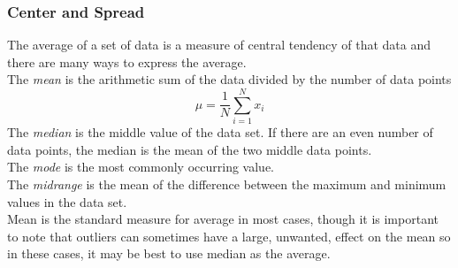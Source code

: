 \documentclass[11pt, fleqn]{article}
\begin{document}
\subsubsection{Center and Spread}
The average of a set of data is a measure of central tendency of that data and there are many ways to express the average.\\
The \textit{mean} is the arithmetic sum of the data divided by the number of data points
$$\mu=\frac{1}{N}\sum_{i=1}^N x_i$$
The \textit{median} is the middle value of the data set. If there are an even number of data points, the median is the mean of the two middle data points.\\
The \textit{mode} is the most commonly occurring value.\\
The \textit{midrange} is the mean of the difference between the maximum and minimum values in the data set.\\

Mean is the standard measure for average in most cases, though it is important to note that outliers can sometimes have a large, unwanted, effect on the mean so in these cases, it may be best to use median as the average.\\
\end{document}
